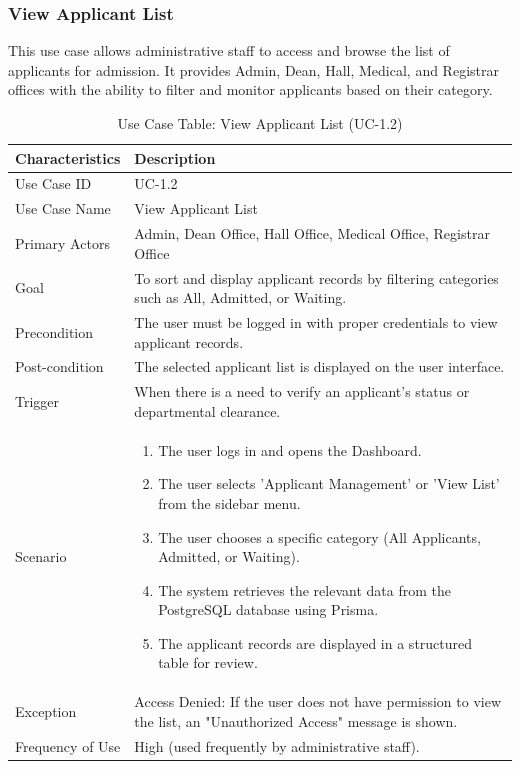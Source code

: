 \subsubsection{View Applicant List}

This use case allows administrative staff to access and browse the list of applicants for admission. It provides Admin, Dean, Hall, Medical, and Registrar offices with the ability to filter and monitor applicants based on their category.

\begin{table}[H]
    \centering
    \small
    \renewcommand{\arraystretch}{1.4}
    \caption{Use Case Table: View Applicant List (UC-1.2)} %
    \label{tab:view_applicant_list}
    \begin{tabularx}{\textwidth}{|l|X|}
        \hline
        \rowcolor[gray]{0.9} {Characteristics} & {Description} \\ \hline
        Use Case ID & UC-1.2 \\ \hline
        Use Case Name & View Applicant List \\ \hline
        Primary Actors & Admin, Dean Office, Hall Office, Medical Office, Registrar Office \\ \hline
        Goal & To sort and display applicant records by filtering categories such as All, Admitted, or Waiting. \\ \hline
        Precondition & The user must be logged in with proper credentials to view applicant records. \\ \hline
        Post-condition & The selected applicant list is displayed on the user interface. \\ \hline
        Trigger & When there is a need to verify an applicant’s status or departmental clearance. \\ \hline
        Scenario & 
        \begin{enumerate}[nosep, leftmargin=*]
            \item The user logs in and opens the Dashboard.
            \item The user selects 'Applicant Management' or 'View List' from the sidebar menu.
            \item The user chooses a specific category (All Applicants, Admitted, or Waiting).
            \item The system retrieves the relevant data from the PostgreSQL database using Prisma.
            \item The applicant records are displayed in a structured table for review.
        \end{enumerate} \\ \hline
        Exception & {Access Denied:} If the user does not have permission to view the list, an "Unauthorized Access" message is shown. \\ \hline
        Frequency of Use & High (used frequently by administrative staff). \\ \hline
    \end{tabularx}
\end{table}
\FloatBarrier